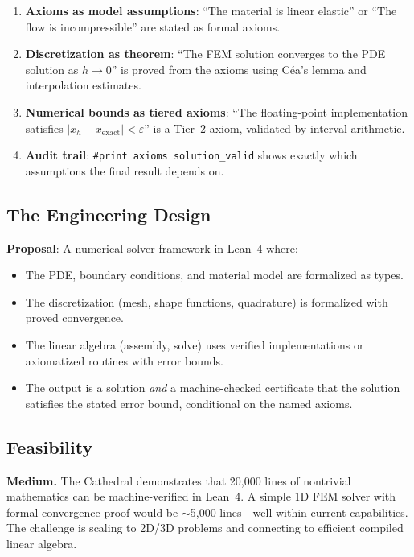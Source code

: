 \documentclass[11pt,a4paper]{article}
\begin{document}
\begin{enumerate}
  \item \textbf{Axioms as model assumptions}: ``The material is
    linear elastic'' or ``The flow is incompressible'' are stated
    as formal axioms.
  \item \textbf{Discretization as theorem}: ``The FEM solution
    converges to the PDE solution as $h \to 0$'' is proved from
    the axioms using C\'ea's lemma and interpolation estimates.
  \item \textbf{Numerical bounds as tiered axioms}: ``The
    floating-point implementation satisfies $|x_h - x_{\text{exact}}|
    < \varepsilon$'' is a Tier~2 axiom, validated by interval
    arithmetic.
  \item \textbf{Audit trail}: \texttt{\#print axioms solution\_valid}
    shows exactly which assumptions the final result depends on.
\end{enumerate}

\subsection{The Engineering Design}

\textbf{Proposal}: A numerical solver framework in Lean~4 where:
\begin{itemize}
  \item The PDE, boundary conditions, and material model are
    formalized as types.
  \item The discretization (mesh, shape functions, quadrature) is
    formalized with proved convergence.
  \item The linear algebra (assembly, solve) uses verified
    implementations or axiomatized routines with error bounds.
  \item The output is a solution \emph{and} a machine-checked
    certificate that the solution satisfies the stated error bound,
    conditional on the named axioms.
\end{itemize}

\subsection{Feasibility}

\textbf{Medium.} The Cathedral demonstrates that 20,000 lines of
nontrivial mathematics can be machine-verified in Lean~4. A simple
1D FEM solver with formal convergence proof would be $\sim$5,000
lines---well within current capabilities. The challenge is scaling
to 2D/3D problems and connecting to efficient compiled linear
algebra.
\end{document}
